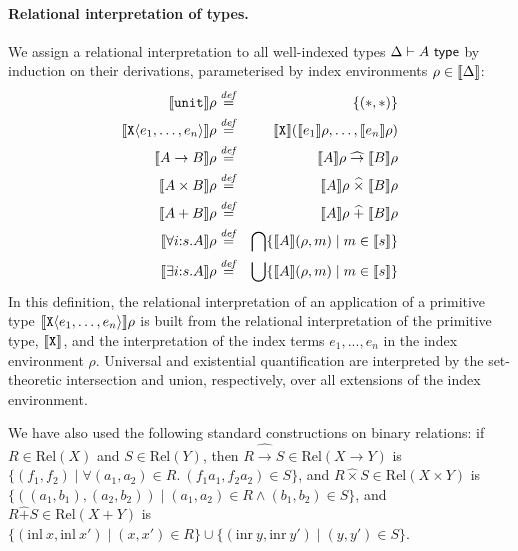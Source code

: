 \documentclass{sigplanconf}
\newcommand{\sepbar}{\mathrel|}
\newcommand{\Rel}{\mathrm{Rel}}
\newcommand{\relArrow}{\mathrel{\widehat\to}}
\newcommand{\relTimes}{\mathrel{\widehat\times}}
\newcommand{\relSum}{\mathrel{\widehat+}}
\newcommand{\tyUnit}{\texttt{unit}}
\newcommand{\tyPrim}[2]{\textup{\texttt{#1}}\langle #2 \rangle}
\newcommand{\tyPrimNm}[1]{\textup{\texttt{#1}}}
\newcommand{\tyArr}{\to}
\newcommand{\tyProduct}{\times}
\newcommand{\isType}{\textup{\textsf{ type}}}
\newcommand{\tyPrimSem}[1]{\left\lfloor #1 \right\rfloor}
\newcommand{\rsem}[1]{\llbracket #1 \rrbracket}
\newcommand{\isDefinedAs}{\stackrel{\mathit{def}}=}
\theoremstyle{examplestyle}
\theoremstyle{restatementstyle}
\begin{document}
\paragraph{Relational interpretation of types.}
We assign a relational interpretation to all well-indexed types $\Delta
\vdash A \isType$ by induction on their derivations, parameterised by
index environments 
$\rho \in \llbracket \Delta \rrbracket$:
\begin{eqnarray*}
  \rsem{\tyUnit} \rho & \isDefinedAs & \{(*,*)\} \\
  \rsem{\tyPrim{X}{e_1,\ldots,e_n}}\rho & \isDefinedAs & 
  \semPrimType{\tyPrimNm{X}} (\semIndexExp{e_1}\rho, \ldots,
  \semIndexExp{e_n}\rho)\\
  \rsem{A \tyArr B} \rho & \isDefinedAs & \rsem{A}\rho \relArrow \rsem{B} \rho \\
  \rsem{A \tyProduct B}\rho & \isDefinedAs & \rsem{A} \rho \relTimes \rsem{B} \rho \\
  \rsem{A + B} \rho & \isDefinedAs & \rsem{A} \rho \relSum \rsem{B} \rho \\
  \rsem{\forall i\mathord:s.A} \rho & \isDefinedAs & 
  \bigcap\{ \rsem{A} {(\rho,m)} \sepbar m \in \semSort{s} \} \\
  \rsem{\exists i\mathord:s.A} \rho & \isDefinedAs & 
  \bigcup\{ \rsem{A} {(\rho,m)} \sepbar m \in \semSort{s} \}
\end{eqnarray*}
In this definition, the relational interpretation of an application of
a primitive type $\rsem{\tyPrim{X}{e_1,\ldots,e_n}}\rho$ is built from
the relational interpretation of the primitive type,
$\rsem{\tyPrimNm{X}}$, and the interpretation of the index terms
$e_1,...,e_n$ in the index environment $\rho$. Universal and
existential quantification are interpreted by the set-theoretic
intersection and union, respectively, over all extensions of the index
environment.

We have also used the following standard %
constructions on binary relations: if $R \in \Rel(X)$ and $S \in
\Rel(Y)$, then $R \relArrow S \in \Rel(X \to Y)$ is %
$\{(f_1,f_2) \sepbar \forall (a_1,a_2) \in R.\ (f_1a_1,f_2a_2) \in S
\}$, and %
$R \relTimes S \in \Rel(X \times Y)$ is %
$\{((a_1,b_1),(a_2,b_2)) \sepbar (a_1,a_2) \in R \land (b_1,b_2) \in S
\}$, and %
$R \relSum S \in \Rel(X + Y)$ is %
$\{ (\mathrm{inl}\ x, \mathrm{inl}\ x') \sepbar (x,x') \in R \} \cup
\{ (\mathrm{inr}\ y, \mathrm{inr}\ y') \sepbar (y,y') \in S \}$.
\end{document}
